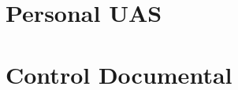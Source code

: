 \documentclass[12pt,openany]{report}
\begin{document}

\chapter{Personal UAS}
\label{chap:04_personal}

\label{fin_cap4} %


\chapter{Control Documental}
\label{chap:documentos}

\label{fin_cap5} %

\label{fin_cap6} %

\appendix 
\renewcommand{\appendixname}{Anexo}


\label{fin_anexos} %


\printbibliography
\end{document}
